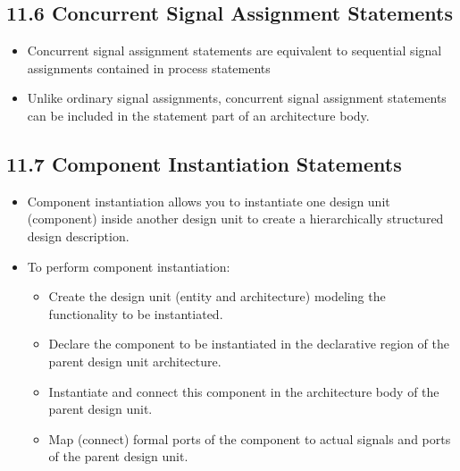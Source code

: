 \documentclass[a4paper,12pt]{article}
\begin{document}
	\subsection*{11.6 Concurrent Signal Assignment Statements}
	\begin{itemize}
		\item Concurrent signal assignment statements are equivalent to sequential signal assignments contained in process statements
		\item Unlike ordinary signal assignments, concurrent signal assignment statements can be included in the statement part of an architecture body.
	\end{itemize}
	
	\subsection*{11.7 Component Instantiation Statements}
	\begin{itemize}
		\item Component instantiation allows you to instantiate one design unit (component) inside another design unit to create a hierarchically structured design description.
		\item To perform component instantiation:
		\begin{itemize}
			\item Create the design unit (entity and architecture) modeling the functionality to be instantiated.
			\item Declare the component to be instantiated in the declarative region of the parent design unit architecture.
			\item Instantiate and connect this component in the architecture body of the parent design unit.
			\item Map (connect) formal ports of the component to actual signals and ports of the parent design unit.
		\end{itemize}
	\end{itemize}
	
\end{document}
